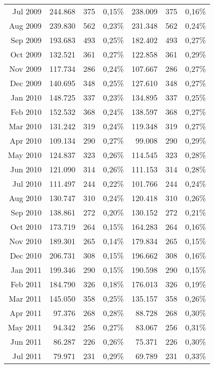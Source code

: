 \begin{longtable}{r|rrr|rrr}
Jul 2009 & 244.868 & 375   & 0,15\% & 238.009 & 375   & 0,16\% \\
Aug 2009 & 239.830 & 562   & 0,23\% & 231.348 & 562   & 0,24\% \\
Sep 2009 & 193.683 & 493   & 0,25\% & 182.402 & 493   & 0,27\% \\
Oct 2009 & 132.521 & 361   & 0,27\% & 122.858 & 361   & 0,29\% \\
Nov 2009 & 117.734 & 286   & 0,24\% & 107.667 & 286   & 0,27\% \\
Dec 2009 & 140.695 & 348   & 0,25\% & 127.610 & 348   & 0,27\% \\
Jan 2010 & 148.725 & 337   & 0,23\% & 134.895 & 337   & 0,25\% \\
Feb 2010 & 152.532 & 368   & 0,24\% & 138.597 & 368   & 0,27\% \\
Mar 2010 & 131.242 & 319   & 0,24\% & 119.348 & 319   & 0,27\% \\
Apr 2010 & 109.134 & 290   & 0,27\% & 99.008  & 290   & 0,29\% \\
May 2010 & 124.837 & 323   & 0,26\% & 114.545 & 323   & 0,28\% \\
Jun 2010 & 121.090 & 314   & 0,26\% & 111.153 & 314   & 0,28\% \\
Jul 2010 & 111.497 & 244   & 0,22\% & 101.766 & 244   & 0,24\% \\
Aug 2010 & 130.747 & 310   & 0,24\% & 120.418 & 310   & 0,26\% \\
Sep 2010 & 138.861 & 272   & 0,20\% & 130.152 & 272   & 0,21\% \\
Oct 2010 & 173.719 & 264   & 0,15\% & 164.283 & 264   & 0,16\% \\
Nov 2010 & 189.301 & 265   & 0,14\% & 179.834 & 265   & 0,15\% \\
Dec 2010 & 206.731 & 308   & 0,15\% & 196.662 & 308   & 0,16\% \\
Jan 2011 & 199.346 & 290   & 0,15\% & 190.598 & 290   & 0,15\% \\
Feb 2011 & 184.790 & 326   & 0,18\% & 176.013 & 326   & 0,19\% \\
Mar 2011 & 145.050 & 358   & 0,25\% & 135.157 & 358   & 0,26\% \\
Apr 2011 & 97.376  & 268   & 0,28\% & 88.728  & 268   & 0,30\% \\
May 2011 & 94.342  & 256   & 0,27\% & 83.067  & 256   & 0,31\% \\
Jun 2011 & 86.287  & 226   & 0,26\% & 75.371  & 226   & 0,30\% \\
Jul 2011 & 79.971  & 231   & 0,29\% & 69.789  & 231   & 0,33\% \\

\end{longtable}
